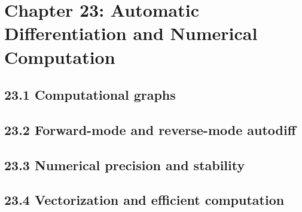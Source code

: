 \section{Chapter 23: Automatic Differentiation and Numerical Computation}

\subsection{23.1 Computational graphs}

\subsection{23.2 Forward-mode and reverse-mode autodiff}

\subsection{23.3 Numerical precision and stability}

\subsection{23.4 Vectorization and efficient computation}

\clearpage

